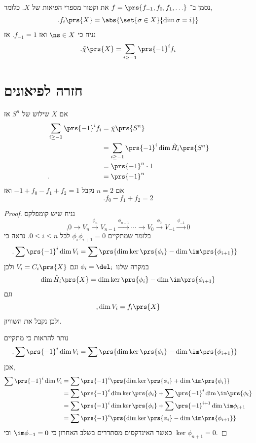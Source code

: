 \documentclass[a4paper,10pt,twoside,openany]{book}
\begin{document}
\begin{proposition}
נסמן ב־%
$f = \prs{f_{-1}, f_0, f_1, \ldots}$
את וקטור מספרי הפיאות של
$X$.
כלומר,
\[\text{.} f_i\prs{X} = \abs{ \set{\sigma \in X}{\dim \sigma = i} }\]
נניח כי
$\ns \in X$
ואז
$f_{-1} = 1$.
אז
\[\text{.} \tilde{\chi}\prs{X} = \sum_{i \geq -1} \prs{-1}^i f_i\]
\end{proposition}

\section{חזרה לפיאונים}

\begin{example}
אם
$X$
שילוש של
$S^n$
אז
\begin{align*}
\sum_{i \geq -1} \prs{-1}^i f_i &= \tilde{\chi}\prs{S^n}
\\&= \sum_{i \geq -1} \prs{-1}^i \dim \tilde{H}_i\prs{S^n}
\\&= \prs{-1}^n \cdot 1
\\ \text{.} \hphantom{\sum_{i \geq -1} \prs{-1}^i f_i} &= \prs{-1}^n
\end{align*}
אם 
$n = 2$
נקבל
$-1 + f_0 - f_1 + f_2 = 1$
ואז
\[\text{.} f_0 - f_1 + f_2 = 2\]
\end{example}

\begin{proof}
נניח שיש קומפלקס
\[\text{,} 0 \to V_n \xrightarrow{\phi_n} V_{n-1} \xrightarrow{\phi_{n-1}} \cdots \to V_0 \xrightarrow{\phi_0} V_{-1} \xrightarrow{\phi_{-1}} 0\]
כלומר שמתקיים
$\phi_i \phi_{i+1} = 0$
לכל
$0 \leq i \leq n$.
נראה כי
\begin{align*}
\text{.} \sum \prs{-1}^i \dim V_i
&=
\sum \prs{\dim \ker \prs{\phi_i} - \dim \im\prs{\phi_{i+1}}}
\end{align*}
במקרה שלנו
$\phi_i = \del_i$
וגם
$V_i = C_i\prs{X}$
ולכן
\begin{align*}
\dim \tilde{H}_i \prs{X} = \dim \ker\prs{\phi_i} - \dim \im \prs{\phi_{i+1}}
\end{align*}
וגם
\[\text{,} \dim V_i = f_i\prs{X}\]
ולכן נקבל את השוויון.

נותר להראות כי מתקיים
\begin{align*}
\text{.} \sum \prs{-1}^i \dim V_i
&=
\sum \prs{\dim \ker \prs{\phi_i} - \dim \im\prs{\phi_{i+1}}}
\end{align*}
אכן,
\begin{align*}
\sum \prs{-1}^i \dim V_i
&=
\sum \prs{-1}^i \prs{\dim \ker\prs{\phi_i} + \dim \im \prs{\phi_i}}
\\&=
\sum \prs{-1}^i \dim \ker \prs{\phi_i}
+
\sum \prs{-1}^i \dim \im \prs{\phi_i}
\\&=
\sum \prs{-1}^i \dim \ker\prs{\phi_i}
+
\sum \prs{-1}^{i+1} \dim \im \phi_{i+1}
\\&=
\sum \prs{-1}^i \prs{\dim \ker \prs{\phi_i} - \dim \im \prs{\phi_{i+1}}}
\end{align*}
כאשר האינדקסים מסתדרים בשלב האחרון כי
$\im \phi_{-1} = 0$
וכי
$\ker \phi_{n+1} = 0$.
\end{proof}
\end{document}
